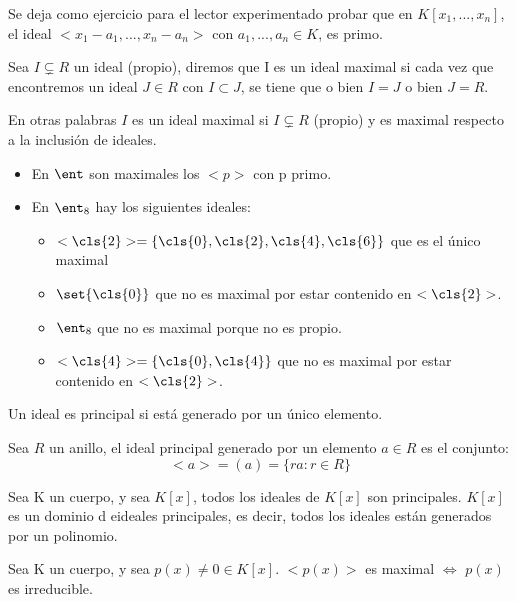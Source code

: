 Se deja como ejercicio para el lector experimentado probar que en $K[x_1,...,x_n]$, el ideal $<x_1-a_1,...,x_n-a_n>$ con $a_1,...,a_n \in K$, es primo.

\begin{defn}
	Sea $I \subsetneq R$ un ideal (propio), diremos que I es un ideal maximal si cada vez que encontremos un ideal $J \in R$ con $I \subset J$, se tiene que o bien $I=J$ o bien $J=R$.

	En otras palabras $I$ es un ideal maximal si $I \subsetneq R$  (propio) y es maximal respecto a la inclusión de ideales.
\end{defn}

\begin{example}
	\begin{itemize}
		\item En $\ent$ son maximales los $<p>$ con p primo.
		\item En $\ent_8$ hay los siguientes ideales:
		\begin{itemize}
			\item $<\cls{2}>=\{\cls{0},\cls{2},\cls{4},\cls{6} \}$ que es el único maximal
			\item $\set{\cls{0}}$ que no es maximal por estar contenido en $<\cls{2}>$.
			\item $\ent_8$ que no es maximal porque no es propio.
			\item $<\cls{4}>=\{\cls{0},\cls{4} \}$ que no es maximal por estar contenido en $<\cls{2}>$.
		\end{itemize}
	\end{itemize}
\end{example}

\begin{defn}
	Un ideal es principal si está generado por un único elemento.
\end{defn}

\begin{example}
	Sea $R$ un anillo, el ideal principal generado por un elemento $a \in R$ es el conjunto:
	$$ <a>=(a)=\{ra: r \in R \} $$
\end{example}

\begin{prop}
	Sea K un cuerpo, y sea $K[x]$, todos los ideales de $K[x]$ son principales. $K[x]$ es un dominio d eideales principales, es decir, todos los ideales están generados por un polinomio.
\end{prop}

\begin{prop}
Sea K un cuerpo, y sea $p(x)\neq 0 \in K[x]$. $<p(x)>$ es maximal $\Leftrightarrow$ $p(x)$ es irreducible.
\end{prop}

